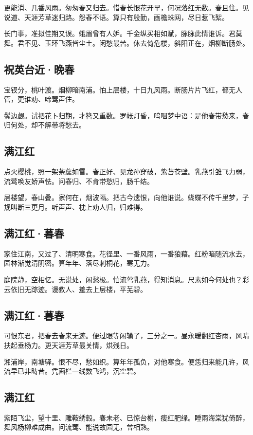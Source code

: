 \documentclass[a5paper]{ctexart}
\begin{document}
	更能消、几番风雨。匆匆春又归去。惜春长恨花开早，何况落红无数。春且住。见说道、天涯芳草迷归路。怨春不语。算只有殷勤，画檐蛛网，尽日惹飞絮。
	
	长门事，准拟佳期又误。蛾眉曾有人妒。千金纵买相如赋，脉脉此情谁诉。君莫舞。君不见、玉环飞燕皆尘土。闲愁最苦。休去倚危楼，斜阳正在，烟柳断肠处。
	
	\subsection{祝英台近·晚春}
	宝钗分，桃叶渡。烟柳暗南浦。怕上层楼，十日九风雨。断肠片片飞红，都无人管，更谁劝、啼莺声住。
	
	鬓边觑。试把花卜归期，才簪又重数。罗帐灯昏，呜咽梦中语：是他春带愁来，春归何处，却不解带将愁去。
	
	\subsection{满江红}
	点火樱桃，照一架荼蘼如雪。春正好、见龙孙穿破，紫苔苍壁。乳燕引雏飞力弱，流莺唤友娇声怯。问春归、不肯带愁归，肠千结。
	
	层楼望，春山叠。家何在，烟波隔。把古今遗恨，向他谁说。蝴蝶不传千里梦，子规叫断三更月。听声声、枕上劝人归，归难得。
	
	\subsection{满江红·暮春}
	家住江南，又过了、清明寒食。花径里、一番风雨，一番狼藉。红粉暗随流水去，园林渐觉清阴密。算年年、落尽刺桐花，寒无力。
	
	庭院静，空相忆。无说处，闲愁极。怕流莺乳燕，得知消息。尺素如今何处也？彩云依旧无踪迹。谩教人、羞去上层楼，平芜碧。
	
	\subsection{满江红·暮春}
	可恨东君，把春去春来无迹。便过眼等闲输了，三分之一。昼永暖翻红杏雨，风晴扶起垂杨力。更天涯芳草最关情，烘残日。
	
	湘浦岸，南塘驿。恨不尽，愁如织。算年年孤负，对他寒食。便恁归来能几许，风流早已非畴昔。凭画栏一线数飞鸿，沉空碧。
	
	\subsection{满江红}
	紫陌飞尘，望十里、雕鞍绣毂。春未老、已惊台榭，瘦红肥绿。睡雨海棠犹倚醉，舞风杨柳难成曲。问流莺、能说故园无，曾相熟。
	
\end{document}
